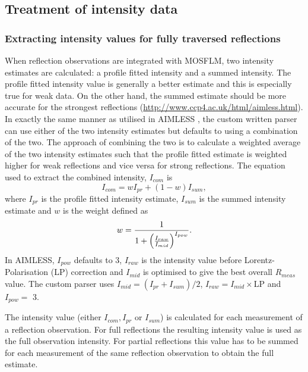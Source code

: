 \subsection{Treatment of intensity data}
\label{sub:Treatment of intensity data}

\subsubsection{Extracting intensity values for fully traversed reflections}
\label{subs:Extracting intensity values for fully traversed reflections}
When reflection observations are integrated with MOSFLM, two intensity estimates are calculated: a profile fitted intensity and a summed intensity.
The profile fitted intensity value is generally a better estimate and this is especially true for weak data.
On the other hand, the summed estimate should be more accurate for the strongest reflections (\url{http://www.ccp4.ac.uk/html/aimless.html}).
In exactly the same manner as utilised in AIMLESS \cite{evans2013}, the custom written parser can use either of the two intensity estimates but defaults to using a combination of the two.
The approach of combining the two is to calculate a weighted average of the two intensity estimates such that the profile fitted estimate is weighted higher for weak reflections and vice versa for strong reflections.
The equation used to extract the combined intensity, $I_{com}$ is
\begin{equation}
    I_{com} = wI_{pr} + (1-w)I_{sum},
\end{equation}
where $I_{pr}$ is the profile fitted intensity estimate, $I_{sum}$ is the summed intensity estimate and $w$ is the weight defined as
\begin{equation}
    w = \frac{1}{1 + \left(\frac{I_{raw}}{I_{mid}}\right)^{I_{pow}}}.
\end{equation}
In AIMLESS, $I_{pow}$ defaults to 3, $I_{raw}$ is the intensity value before Lorentz-Polarisation (LP) correction and $I_{mid}$ is optimised to give the best overall $R_{meas}$ value.
The custom parser uses $I_{mid} = (I_{pr} + I_{sum})/2$, $I_{raw} = I_{mid} \times $LP and $I_{pow} =$ 3.

The intensity value (either $I_{com}, I_{pr}$ or $I_{sum}$) is calculated for each measurement of a reflection observation.
For full reflections the resulting intensity value is used as the full observation intensity.
For partial reflections this value has to be summed for each measurement of the same reflection observation to obtain the full estimate.

